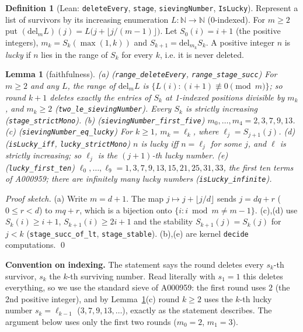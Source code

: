 \documentclass[11pt]{article}
\newtheorem{lemma}[theorem]{Lemma}
\theoremstyle{definition}
\newtheorem{definition}[theorem]{Definition}
\begin{document}
\begin{definition}[Lean: \texttt{deleteEvery}, \texttt{stage}, \texttt{sievingNumber},
\texttt{IsLucky}]
Represent a list of survivors by its increasing enumeration $L:\mathbb{N}\to\mathbb{N}$
(0-indexed). For $m\ge 2$ put $(\mathrm{del}_m L)(j)=L\bigl(j+\lfloor j/(m-1)\rfloor\bigr)$. Let
$S_0(i)=i+1$ (the positive integers), $m_k=S_k(\max(1,k))$ and $S_{k+1}=\mathrm{del}_{m_k}S_k$.
A positive integer $n$ is \emph{lucky} if $n$ lies in the range of $S_k$ for every $k$, i.e. it
is never deleted.
\end{definition}

\begin{lemma}[faithfulness]\label{lem:faith}
(a) (\texttt{range\_deleteEvery}, \texttt{range\_stage\_succ}) For $m\ge 2$ and any $L$, the range
of $\mathrm{del}_m L$ is $\{L(i) : (i+1)\not\equiv 0 \pmod m\}$; so round $k+1$ deletes exactly
the entries of $S_k$ at 1-indexed positions divisible by $m_k$, and $m_k\ge 2$
(\texttt{two\_le\_sievingNumber}). Every $S_k$ is strictly increasing (\texttt{stage\_strictMono}).
(b) (\texttt{sievingNumber\_first\_five}) $m_0,\dots,m_4 = 2,3,7,9,13$.
(c) (\texttt{sievingNumber\_eq\_lucky}) For $k\ge 1$, $m_k=\ell_k$, where $\ell_j=S_{j+1}(j)$.
(d) (\texttt{isLucky\_iff}, \texttt{lucky\_strictMono}) $n$ is lucky iff $n=\ell_j$ for some $j$,
and $\ell$ is strictly increasing; so $\ell_j$ is the $(j+1)$-th lucky number.
(e) (\texttt{lucky\_first\_ten}) $\ell_0,\dots,\ell_9 = 1,3,7,9,13,15,21,25,31,33$, the first ten
terms of A000959; there are infinitely many lucky numbers (\texttt{isLucky\_infinite}).
\end{lemma}

\noindent\emph{Proof sketch.} (a) Write $m=d+1$. The map $j\mapsto j+\lfloor j/d\rfloor$ sends
$j=dq+r$ ($0\le r<d$) to $mq+r$, which is a bijection onto $\{i : i\bmod m\ne m-1\}$. (c),(d)
use $S_k(i)\ge i+1$, $S_{k+1}(i)\ge 2i+1$ and the stability $S_{k+1}(j)=S_k(j)$ for $j<k$
(\texttt{stage\_succ\_of\_lt}, \texttt{stage\_stable}). (b),(e) are kernel \texttt{decide}
computations. \qed

\textbf{Convention on indexing.} The statement says the round deletes every $s_k$-th survivor,
$s_k$ the $k$-th surviving number. Read literally with $s_1=1$ this deletes everything, so we use
the standard sieve of A000959: the first round uses $2$ (the 2nd positive integer), and by
Lemma~\ref{lem:faith}(c) round $k\ge 2$ uses the $k$-th lucky number $s_k=\ell_{k-1}$
($3,7,9,13,\dots$), exactly as the statement describes. The argument below uses only the first two
rounds ($m_0=2$, $m_1=3$).
\end{document}
